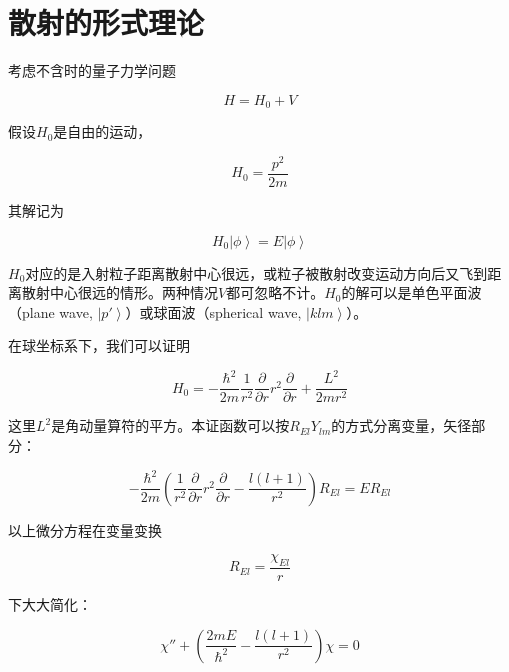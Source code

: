 \section{散射的形式理论}

考虑不含时的量子力学问题

\begin{equation}
H = H_0 + V
\end{equation}

假设$H_0$是自由的运动，

\begin{equation}
H_0 = \frac{p^2}{2m}
\end{equation}

其解记为

\begin{equation}
H_0 \left| \phi \right\rangle = E \left| \phi \right\rangle
\end{equation}

$H_0$对应的是入射粒子距离散射中心很远，或粒子被散射改变运动方向后又飞到距离散射中心很远的情形。两种情况$V$都可忽略不计。$H_0$的解可以是单色平面波（plane wave, $\left| p' \right\rangle$）或球面波（spherical wave, $\left| klm \right\rangle$）。

在球坐标系下，我们可以证明

\begin{equation}
H_0 = - \frac{\hbar^2}{ 2m }  \frac{1}{r^2} \frac{\partial }{\partial r} r^2 \frac{\partial }{\partial r}  + \frac{L^2}{ 2m r^2}
\end{equation}

这里$L^2$是角动量算符的平方。本证函数可以按$R_{El} Y_{lm}$的方式分离变量，矢径部分：

\begin{equation}
- \frac{\hbar^2}{ 2m } \left( \frac{1}{r^2} \frac{\partial }{\partial r} r^2 \frac{\partial }{\partial r} - \frac{l (l + 1)}{ r^2}  \right) R_{El} = E R_{El}
\end{equation}

以上微分方程在变量变换

\begin{equation}
R_{El} = \frac{\chi_{El}}{r}
\end{equation}

下大大简化：

\begin{equation}
\chi'' + \left( \frac{2mE}{\hbar^2} - \frac{l(l+1)}{r^2} \right) \chi = 0
\end{equation}

